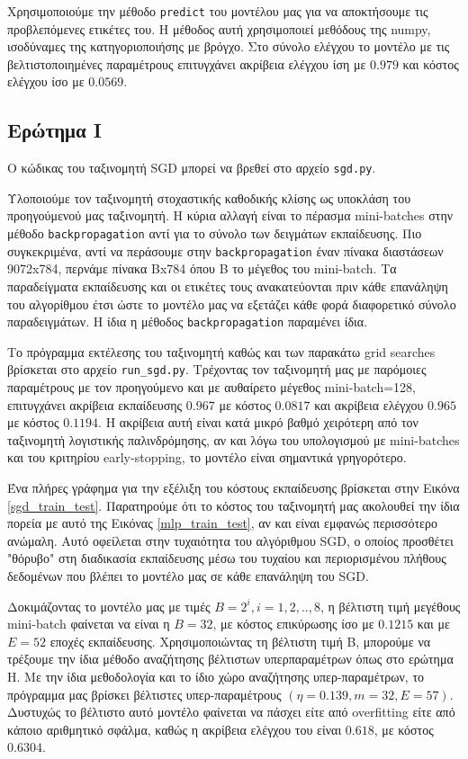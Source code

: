 \documentclass{article}
\newcommand{\code}{\texttt}
\begin{document}
Χρησιμοποιούμε την μέθοδο \code{predict} του μοντέλου μας για να αποκτήσουμε τις προβλεπόμενες ετικέτες του. Η μέθοδος αυτή χρησιμοποιεί μεθόδους της numpy, ισοδύναμες της κατηγοριοποιήσης με βρόγχο. Στο σύνολο ελέγχου το μοντέλο με τις βελτιστοποιημένες παραμέτρους επιτυγχάνει ακρίβεια ελέγχου ίση με $0.979$ και κόστος ελέγχου ίσο με $0.0569$.

\subsection{Ερώτημα Ι}

Ο κώδικας του ταξινομητή SGD μπορεί να βρεθεί στο αρχείο \code{sgd.py}.

Υλοποιούμε τον ταξινομητή στοχαστικής καθοδικής κλίσης ως υποκλάση του προηγούμενού μας ταξινομητή. Η κύρια αλλαγή είναι το πέρασμα mini-batches στην μέθοδο \code{backpropagation} αντί για το σύνολο των δειγμάτων εκπαίδευσης. Πιο συγκεκριμένα, αντί να περάσουμε στην \code{backpropagation} έναν πίνακα διαστάσεων 9072x784, περνάμε πίνακα Βx784 όπου Β το μέγεθος του mini-batch. Τα παραδείγματα εκπαίδευσης και οι ετικέτες τους ανακατεύονται πριν κάθε επανάληψη του αλγορίθμου έτσι ώστε το μοντέλο μας να εξετάζει κάθε φορά διαφορετικό σύνολο παραδειγμάτων. Η ίδια η μέθοδος \code{backpropagation} παραμένει ίδια.


 Το πρόγραμμα εκτέλεσης του ταξινομητή καθώς και των παρακάτω grid searches βρίσκεται στο αρχείο \code{run\_sgd.py}. Τρέχοντας τον ταξινομητή μας με παρόμοιες παραμέτρους με τον προηγούμενο και με αυθαίρετο μέγεθος mini-batch=128, επιτυγχάνει ακρίβεια εκπαίδευσης $0.967$ με κόστος $0.0817$ και ακρίβεια ελέγχου $0.965$ με κόστος $0.1194$. Η ακρίβεια αυτή είναι κατά μικρό βαθμό χειρότερη από τον ταξινομητή λογιστικής παλινδρόμησης, αν και λόγω του υπολογισμού με mini-batches και του κριτηρίου early-stopping, το μοντέλο είναι σημαντικά γρηγορότερο.
 
 Ένα πλήρες γράφημα για την εξέλιξη του κόστους εκπαίδευσης βρίσκεται στην Εικόνα \ref{sgd_train_test}. Παρατηρούμε ότι το κόστος του ταξινομητή μας ακολουθεί την ίδια πορεία με αυτό της Εικόνας \ref{mlp_train_test}, αν και είναι εμφανώς περισσότερο ανώμαλη. Αυτό οφείλεται στην τυχαιότητα του αλγόριθμου SGD, ο οποίος προσθέτει "θόρυβο" στη διαδικασία εκπαίδευσης μέσω του τυχαίου και περιορισμένου πλήθους δεδομένων που βλέπει το μοντέλο μας σε κάθε επανάληψη του SGD.

Δοκιμάζοντας το μοντέλο μας με τιμές $Β=2^{i}, i=1,2,..,8$, η βέλτιστη τιμή μεγέθους mini-batch φαίνεται να είναι η $B=32$, με κόστος επικύρωσης ίσο με $0.1215$ και με $Ε=52$ εποχές εκπαίδευσης. Χρησιμοποιώντας τη βέλτιστη τιμή B, μπορούμε να τρέξουμε την ίδια μέθοδο αναζήτησης βέλτιστων υπερπαραμέτρων όπως στο ερώτημα Η. Με την ίδια μεθοδολογία και το ίδιο χώρο αναζήτησης υπερ-παραμέτρων, το πρόγραμμα μας βρίσκει βέλτιστες υπερ-παραμέτρους $(\eta=0.139, m=32, E=57)$. Δυστυχώς το βέλτιστο αυτό μοντέλο φαίνεται να πάσχει είτε από overfitting είτε από κάποιο αριθμητικό σφάλμα, καθώς η ακρίβεια ελέγχου του είναι $0.618$, με κόστος $0.6304$. 
\end{document}
